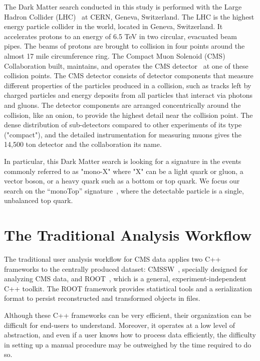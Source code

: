 \documentclass[a4paper]{jpconf}
\begin{document}
The Dark Matter search conducted in this study is performed with the Large Hadron Collider (LHC)~\cite{1748-0221-3-08-S08001} at CERN, Geneva, Switzerland. The LHC is the highest energy particle collider in the world, located in Geneva, Switzerland. It accelerates protons to an energy of 6.5 TeV in two circular, evacuated beam pipes. The beams of protons are brought to collision in four points around the almost 17 mile circumference ring. The Compact Muon Solenoid (CMS) Collaboration built, maintains, and operates the CMS detector~\cite{cms} at one of these collision points. The CMS detector consists of detector components that measure different properties of the particles produced in a collision, such as tracks left by charged particles and energy deposits from all particles that interact via photons and gluons. The detector components are arranged concentrically around the collision, like an onion, to provide the highest detail near the collision point. The dense distribution of sub-detectors compared to other experiments of its type ("compact"), and the detailed instrumentation for measuring muons gives the 14,500 ton detector and the collaboration its name.

In particular, this Dark Matter search is looking for a signature in the events commonly referred to as "mono-X" where "X" can be a light quark or gluon, a vector boson, or a heavy quark such as a bottom or top quark. We focus our search on the “monoTop” signature~\cite{CMS-PAS-EXO-16-017}, where the detectable particle is a single, unbalanced top quark.

\section{The Traditional Analysis Workflow}
\label{sec:root_workflow}

The traditional user analysis workflow for CMS data applies two C++ frameworks to the centrally produced dataset: CMSSW~\cite{cmssw}, specially designed for analyzing CMS data, and ROOT~\cite{root}, which is a general, experiment-independent C++ toolkit. The ROOT framework provides statistical tools and a serialization format to persist reconstructed and transformed objects in files.

Although these C++ frameworks can be very efficient, their organization can be difficult for end-users to understand. Moreover, it operates at a low level of abstraction, and even if a user knows how to process data efficiently, the difficulty in setting up a manual procedure may be outweighed by the time required to do so.
\end{document}

